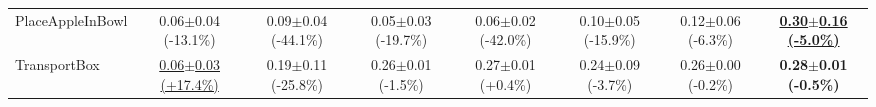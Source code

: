 \begin{table}[htbp]
\begin{adjustbox}{max width=\textwidth}
\begin{tabular}{l*{7}{c}}
PlaceAppleInBowl & 0.06$\pm$0.04 \scriptsize{(-13.1\%)} & 0.09$\pm$0.04 \scriptsize{(-44.1\%)} & 0.05$\pm$0.03 \scriptsize{(-19.7\%)} & 0.06$\pm$0.02 \scriptsize{(-42.0\%)} & 0.10$\pm$0.05 \scriptsize{(-15.9\%)} & 0.12$\pm$0.06 \scriptsize{(-6.3\%)} & \textbf{\underline{0.30$\pm$0.16 \scriptsize{(-5.0\%)}}} \\
TransportBox & \underline{0.06$\pm$0.03 \scriptsize{(+17.4\%)}} & 0.19$\pm$0.11 \scriptsize{(-25.8\%)} & 0.26$\pm$0.01 \scriptsize{(-1.5\%)} & 0.27$\pm$0.01 \scriptsize{(+0.4\%)} & 0.24$\pm$0.09 \scriptsize{(-3.7\%)} & 0.26$\pm$0.00 \scriptsize{(-0.2\%)} & \textbf{0.28$\pm$0.01 \scriptsize{(-0.5\%)}} \\
\bottomrule
\end{tabular}
\end{adjustbox}
\end{table}

